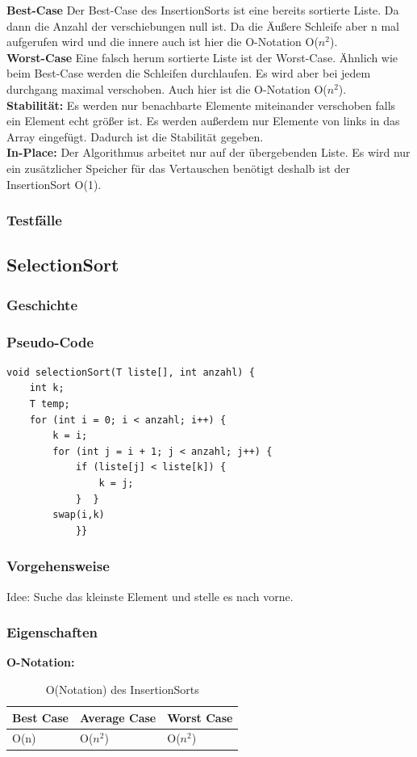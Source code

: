 \documentclass{article}
\begin{document}
\textbf{Best-Case} Der Best-Case des InsertionSorts ist eine bereits sortierte Liste. Da dann die Anzahl der verschiebungen null ist. Da die Äußere Schleife aber n mal aufgerufen wird und die innere auch ist hier die O-Notation O($n^{2}$). \\
\textbf{Worst-Case} Eine falsch herum sortierte Liste ist der Worst-Case. Ähnlich wie beim Best-Case werden die Schleifen durchlaufen. Es wird aber bei jedem durchgang maximal verschoben. Auch hier ist die O-Notation O($n^{2}$).\\
\textbf{Stabilität:}  Es werden nur benachbarte Elemente miteinander verschoben falls ein Element echt größer ist. Es werden außerdem nur Elemente von links in das Array eingefügt. Dadurch ist die Stabilität gegeben.\\

\textbf{In-Place:}  Der Algorithmus arbeitet nur auf der übergebenden Liste. Es wird nur ein zusätzlicher Speicher für das Vertauschen benötigt deshalb ist der InsertionSort O(1).\\


\subsubsection{Testfälle}

\subsection{SelectionSort}
\subsubsection{Geschichte}
\subsubsection{Pseudo-Code}
\begin{lstlisting}
void selectionSort(T liste[], int anzahl) {
    int k;
    T temp;
    for (int i = 0; i < anzahl; i++) {
        k = i;
        for (int j = i + 1; j < anzahl; j++) {
            if (liste[j] < liste[k]) {
                k = j;
            }  }
        swap(i,k)
            }}
\end{lstlisting}
\subsubsection{Vorgehensweise}
Idee: Suche das kleinste Element und stelle es nach vorne.
\subsubsection{Eigenschaften}
\textbf{O-Notation:}
\begin{table}
\centering
\begin{tabular}{lll}
	\hline
	\textbf{Best Case} & \textbf{Average Case} & \textbf{Worst Case} \\
	\hline
	O(n) & O($n^{2}$) & O($n^{2}$) \\
	\hline
\end{tabular}
\caption{O(Notation) des InsertionSorts}
\label{tab:InsertioneSort}
\end{table}
\end{document}
